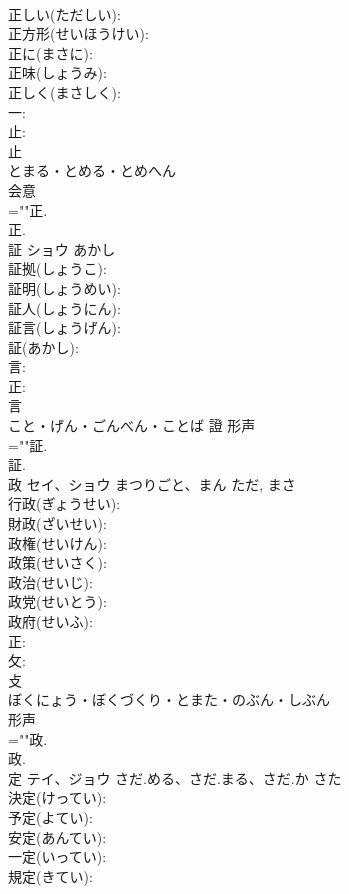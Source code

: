 \documentclass[8pt]{extreport}
\begin{document}
\begin{CJK}{UTF8}{min}
\\	正しい(ただしい): 
\\	正方形(せいほうけい): 
\\	正に(まさに): 
\\	正味(しょうみ): 
\\	正しく(まさしく): 
\\	一: 
\\	止: 
\\	止	
\\	とまる・とめる・とめへん	
\\	会意 
\\	=""正.
\\	正.
\\	証	ショウ	あかし		
\\	証拠(しょうこ): 
\\	証明(しょうめい): 
\\	証人(しょうにん): 
\\	証言(しょうげん): 
\\	証(あかし): 
\\	言: 
\\	正: 
\\	言	
\\	こと・げん・ごんべん・ことば	證	形声 
\\	=""証.
\\	証.
\\	政	セイ、ショウ	まつりごと、まん	ただ, まさ	
\\	行政(ぎょうせい): 
\\	財政(ざいせい): 
\\	政権(せいけん): 
\\	政策(せいさく): 
\\	政治(せいじ): 
\\	政党(せいとう): 
\\	政府(せいふ): 
\\	正: 
\\	攵: 
\\	攴	
\\	ぼくにょう・ぼくづくり・とまた・のぶん・しぶん	
\\	形声 
\\	=""政.
\\	政.
\\	定	テイ、ジョウ	さだ.める、さだ.まる、さだ.か	さた	
\\	決定(けってい): 
\\	予定(よてい): 
\\	安定(あんてい): 
\\	一定(いってい): 
\\	規定(きてい): 

\end{CJK}
\end{document}

